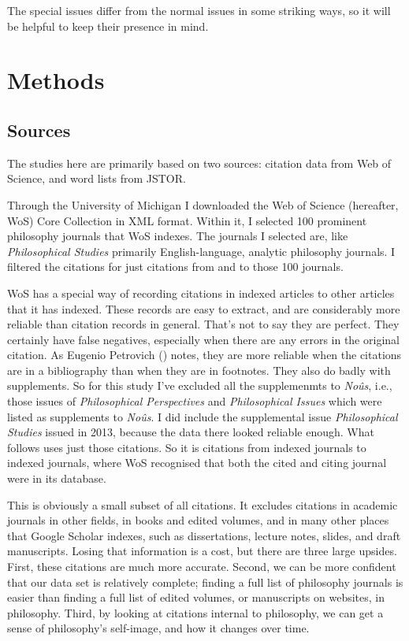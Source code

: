 \documentclass[
  10pt,
  letterpaper,
  DIV=11,
  numbers=noendperiod,
  twoside]{scrartcl}
\begin{document}
The special issues differ from the normal issues in some striking ways,
so it will be helpful to keep their presence in mind.

\section{Methods}\label{sec-methods}

\subsection{Sources}\label{sec-sources}

The studies here are primarily based on two sources: citation data from
Web of Science, and word lists from JSTOR.

Through the University of Michigan I downloaded the Web of Science
(hereafter, WoS) Core Collection in XML format. Within it, I selected
100 prominent philosophy journals that WoS indexes. The journals I
selected are, like \emph{Philosophical Studies} primarily
English-language, analytic philosophy journals. I filtered the citations
for just citations from and to those 100 journals.

WoS has a special way of recording citations in indexed articles to
other articles that it has indexed. These records are easy to extract,
and are considerably more reliable than citation records in general.
That's not to say they are perfect. They certainly have false negatives,
especially when there are any errors in the original citation. As
Eugenio Petrovich () notes,
they are more reliable when the citations are in a bibliography than
when they are in footnotes. They also do badly with supplements. So for
this study I've excluded all the supplemenmts to \emph{Noûs}, i.e.,
those issues of \emph{Philosophical Perspectives} and
\emph{Philosophical Issues} which were listed as supplements to
\emph{Noûs}. I did include the supplemental issue \emph{Philosophical
Studies} issued in 2013, because the data there looked reliable enough.
What follows uses just those citations. So it is citations from indexed
journals to indexed journals, where WoS recognised that both the cited
and citing journal were in its database.

This is obviously a small subset of all citations. It excludes citations
in academic journals in other fields, in books and edited volumes, and
in many other places that Google Scholar indexes, such as dissertations,
lecture notes, slides, and draft manuscripts. Losing that information is
a cost, but there are three large upsides. First, these citations are
much more accurate. Second, we can be more confident that our data set
is relatively complete; finding a full list of philosophy journals is
easier than finding a full list of edited volumes, or manuscripts on
websites, in philosophy. Third, by looking at citations internal to
philosophy, we can get a sense of philosophy's self-image, and how it
changes over time.
\end{document}
